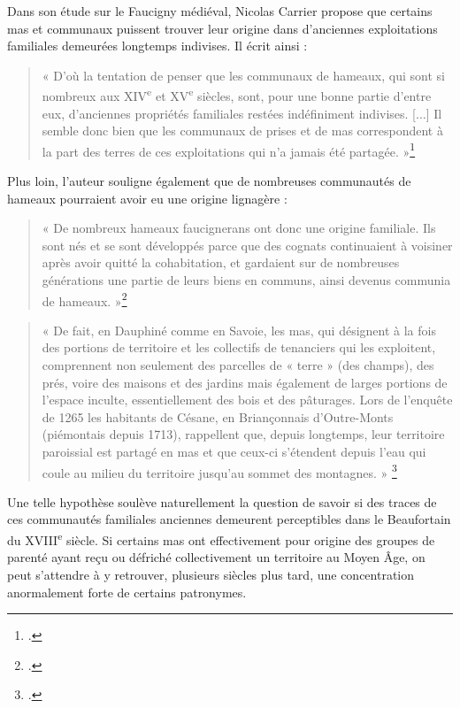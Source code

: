 \documentclass[12pt,a4paper]{report}
\begin{document}
Dans son étude sur le Faucigny médiéval, Nicolas Carrier propose que certains mas et communaux puissent trouver leur origine dans d'anciennes exploitations familiales demeurées longtemps indivises. Il écrit ainsi :

\begin{quote}
	« D’où la tentation de penser que les communaux de hameaux, qui sont si nombreux aux XIV\textsuperscript{e} et XV\textsuperscript{e} siècles, sont, pour une bonne partie d’entre eux, d’anciennes propriétés familiales restées indéfiniment indivises. [...] Il semble donc bien que les communaux de prises et de mas correspondent à la part des terres de ces exploitations qui n’a jamais été partagée. »\footcite[247]{Carrier2001VieMontagnardeFaucigny}
\end{quote}

Plus loin, l'auteur souligne également que de nombreuses communautés de hameaux pourraient avoir eu une origine lignagère :

\begin{quote}
	« De nombreux hameaux faucignerans ont donc une origine familiale. Ils sont nés et se sont développés parce que des cognats continuaient à voisiner après avoir quitté la cohabitation, et gardaient sur de nombreuses générations une partie de leurs biens en communs, ainsi devenus communia de hameaux. »\footcite[247-248]{Carrier2001VieMontagnardeFaucigny}
\end{quote}

	\begin{quote}
	« De fait, en Dauphiné comme en Savoie, les mas, qui désignent à la fois des portions de territoire et les collectifs de tenanciers qui les exploitent, comprennent non seulement des parcelles de « terre » (des champs), des prés, voire des maisons et des jardins mais également de larges portions de l’espace inculte, essentiellement des bois et des pâturages. Lors de l’enquête de 1265 les habitants de Césane, en Briançonnais d’Outre-Monts (piémontais depuis 1713), rappellent que, depuis longtemps, leur territoire paroissial est partagé en mas et que ceux-ci s’étendent depuis l’eau qui coule au milieu du territoire jusqu’au sommet des montagnes. »
	\footcite[50]{Mouthon2019MontagnesMedievales}
\end{quote}


Une telle hypothèse soulève naturellement la question de savoir si des traces de ces communautés familiales anciennes demeurent perceptibles dans le Beaufortain du XVIII\textsuperscript{e} siècle. Si certains mas ont effectivement pour origine des groupes de parenté ayant reçu ou défriché collectivement un territoire au Moyen Âge, on peut s'attendre à y retrouver, plusieurs siècles plus tard, une concentration anormalement forte de certains patronymes.
\end{document}
